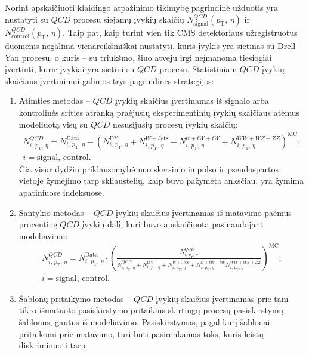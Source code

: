 \documentclass[a4paper, 12pt, oneside]{article}
\newcommand{\pT}{p_{\mathrm{T}}}
\newcommand{\tbarW}{\bar{t}W}
\newcommand{\ttbar}{t\bar{t}}
\newcommand{\QCD}{QC\! D}
\begin{document}
Norint apskaičiuoti klaidingo atpažinimo tikimybę pagrindinė užduotis yra nustatyti su $\QCD$ procesu siejamų įvykių skaičių
$N^{\QCD}_{\mathrm{signal}}(\pT, \, \eta)$ ir $N^{\QCD}_{\mathrm{control}}(\pT, \, \eta)$.
Taip pat, kaip turint vien tik CMS detektoriaus užregistruotus duomenis negalima vienareikšmiškai nustatyti, kuris įvykis yra
sietinas su Drell-Yan procesu, o kuris -- su triukšmo, šiuo atveju irgi neįmanoma tiesiogiai įvertinti, kurie įvykiai yra
sietini su $\QCD$ procesu.
Statistiniam $\QCD$ įvykių skaičiaus įvertinimui galimos trys pagrindinės strategijos:
\begin{enumerate}
	\item Atimties metodas -- $\QCD$ įvykių skaičius įvertinamas iš signalo arba kontrolinės srities atranką praėjusių eksperimentinių
	įvykių skaičiaus atėmus modeliuotą visų su $\QCD$ nesusijusių procesų įvykių skaičių:
	\begin{multline}
		N^{\QCD}_{i, \, \pT, \, \eta} = N^{\mathrm{Data}}_{i, \, \pT, \, \eta} - \left( N^{\mathrm{DY}}_{i, \, \pT, \, \eta} +
		N^{W+\mathrm{Jets}}_{i, \, \pT, \, \eta} +  N^{\ttbar+tW+\tbarW}_{i, \, \pT, \, \eta} +
		N^{WW+WZ+ZZ}_{i, \, \pT, \, \eta} \right)^{\mathrm{MC}}; \\ i = \mathrm{signal}, \, \mathrm{control}.
	\end{multline}
	Čia visur dydžių priklausomybė nuo skersinio impulso ir pseudospartos vietoje žymėjimo tarp skliaustelių, kaip buvo pažymėta anksčiau,
	yra žymima apatiniuose indeksuose.
	\item Santykio metodas -- $\QCD$ įvykių skaičius įvertinamas iš matavimo paėmus procentinę $\QCD$ įvykių dalį, kuri buvo apskaičiuota
	pasinaudojant modeliavimu:
	\begin{multline}
		N^{\QCD}_{i, \, \pT, \, \eta} = N^{\mathrm{Data}}_{i, \, \pT, \, \eta} \cdot \left(\frac{N^{\QCD}_{i, \, \pT, \, \eta}}
		{N^{\QCD}_{i, \, \pT, \, \eta} + N^{\mathrm{DY}}_{i, \, \pT, \, \eta} + N^{W+\mathrm{Jets}}_{i, \, \pT, \, \eta} +
		N^{\ttbar+tW+\tbarW}_{i, \, \pT, \, \eta} N^{WW+WZ+ZZ}_{i, \, \pT, \, \eta}} \right)^{\mathrm{MC}}; \\ i = \mathrm{signal}, \, \mathrm{control}.
	\end{multline}
	\item Šablonų pritaikymo metodas -- $\QCD$ įvykių skaičius įvertinamas prie tam tikro išmatuoto pasiskirstymo pritaikius
	skirtingų procesų pasiskirstymų šablonus, gautus iš modeliavimo.
	Pasiskirstymas, pagal kurį šablonai pritaikomi prie matavimo, turi būti pasirenkamas toks, kuris leistų diskriminuoti tarp

\end{enumerate}
\end{document}
